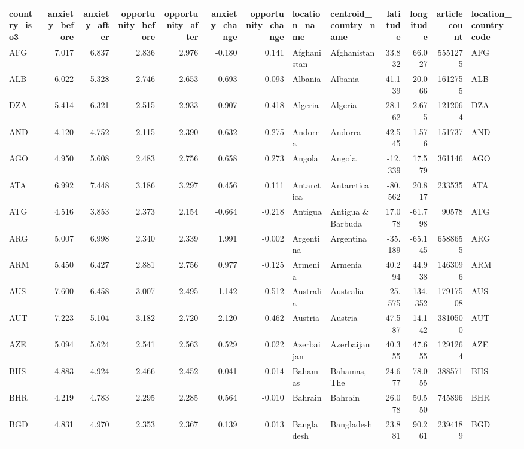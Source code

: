 \begin{tabular}{lrrrrrrllrrrl}
\toprule
country\_iso3 & anxiety\_before & anxiety\_after & opportunity\_before & opportunity\_after & anxiety\_change & opportunity\_change & location\_name & centroid\_country\_name & latitude & longitude & article\_count & location\_country\_code \\
\midrule
AFG & 7.017 & 6.837 & 2.836 & 2.976 & -0.180 & 0.141 & Afghanistan & Afghanistan & 33.832 & 66.027 & 5551275 & AFG \\
ALB & 6.022 & 5.328 & 2.746 & 2.653 & -0.693 & -0.093 & Albania & Albania & 41.139 & 20.066 & 1612755 & ALB \\
DZA & 5.414 & 6.321 & 2.515 & 2.933 & 0.907 & 0.418 & Algeria & Algeria & 28.162 & 2.675 & 1212064 & DZA \\
AND & 4.120 & 4.752 & 2.115 & 2.390 & 0.632 & 0.275 & Andorra & Andorra & 42.545 & 1.576 & 151737 & AND \\
AGO & 4.950 & 5.608 & 2.483 & 2.756 & 0.658 & 0.273 & Angola & Angola & -12.339 & 17.579 & 361146 & AGO \\
ATA & 6.992 & 7.448 & 3.186 & 3.297 & 0.456 & 0.111 & Antarctica & Antarctica & -80.562 & 20.817 & 233535 & ATA \\
ATG & 4.516 & 3.853 & 2.373 & 2.154 & -0.664 & -0.218 & Antigua & Antigua \& Barbuda & 17.078 & -61.798 & 90578 & ATG \\
ARG & 5.007 & 6.998 & 2.340 & 2.339 & 1.991 & -0.002 & Argentina & Argentina & -35.189 & -65.145 & 6588655 & ARG \\
ARM & 5.450 & 6.427 & 2.881 & 2.756 & 0.977 & -0.125 & Armenia & Armenia & 40.294 & 44.938 & 1463096 & ARM \\
AUS & 7.600 & 6.458 & 3.007 & 2.495 & -1.142 & -0.512 & Australia & Australia & -25.575 & 134.352 & 17917508 & AUS \\
AUT & 7.223 & 5.104 & 3.182 & 2.720 & -2.120 & -0.462 & Austria & Austria & 47.587 & 14.142 & 3810500 & AUT \\
AZE & 5.094 & 5.624 & 2.541 & 2.563 & 0.529 & 0.022 & Azerbaijan & Azerbaijan & 40.355 & 47.655 & 1291264 & AZE \\
BHS & 4.883 & 4.924 & 2.466 & 2.452 & 0.041 & -0.014 & Bahamas & Bahamas, The & 24.677 & -78.055 & 388571 & BHS \\
BHR & 4.219 & 4.783 & 2.295 & 2.285 & 0.564 & -0.010 & Bahrain & Bahrain & 26.078 & 50.550 & 745896 & BHR \\
BGD & 4.831 & 4.970 & 2.353 & 2.367 & 0.139 & 0.013 & Bangladesh & Bangladesh & 23.881 & 90.261 & 2394189 & BGD \\

\end{tabular}
